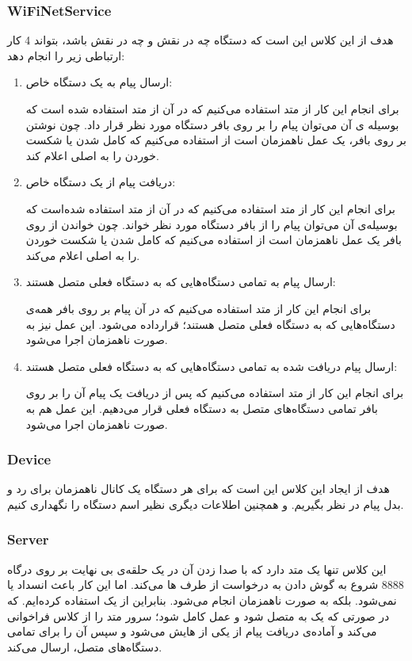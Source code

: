 \subsubsection{WiFiNetService}
هدف از این کلاس این است که دستگاه چه در نقش 
و چه در نقش 
باشد، بتواند 4 کار ارتباطی زیر را انجام دهد:
\begin{enumerate}
	\item ارسال پیام به یک دستگاه خاص:
	
	برای انجام این کار از متد
	استفاده می‌کنیم که در آن از متد 
	استفاده شده است که بوسیله ی آن می‌توان پیام را بر روی بافر دستگاه مورد نظر قرار داد. چون نوشتن بر روی بافر، یک عمل ناهمزمان است از
	استفاده می‌کنیم که کامل شدن یا شکست خوردن را به 
	اصلی اعلام کند.
	\item دریافت پیام از یک دستگاه خاص:
	
	برای انجام این کار از متد
	استفاده می‌کنیم که در آن از متد
	استفاده شده‌است که بوسیله‌ی آن می‌توان پیام را از بافر دستگاه مورد نظر خواند. چون خواندن از روی بافر یک عمل ناهمزمان است از 
	استفاده می‌کنیم که کامل شدن یا شکست خوردن را به 
	اصلی اعلام می‌کند.
	
	\item ارسال پیام به تمامی دستگاه‌هایی که به دستگاه فعلی متصل هستند:

برای انجام این کار از متد
استفاده می‌کنیم که در آن پیام بر روی بافر همه‌ی دستگاه‌هایی که به دستگاه فعلی متصل هستند؛ قرار‌داده می‌شود. این عمل نیز به صورت ناهمزمان اجرا می‌شود.

	\item ارسال پیام دریافت شده به تمامی دستگاه‌هایی که به دستگاه فعلی متصل هستند:
	
	برای انجام این کار از متد
	استفاده می‌کنیم که پس از دریافت یک پیام آن را بر روی بافر تمامی دستگاه‌های متصل به دستگاه فعلی قرار می‌دهیم. این عمل هم به صورت ناهمزمان اجرا می‌شود.
	
\end{enumerate}
\subsubsection{Device}
هدف از ایجاد این کلاس این است که برای هر دستگاه یک کانال ناهمزمان 
برای رد و بدل پیام در نظر بگیریم. و همچنین اطلاعات دیگری نظیر اسم دستگاه را نگهداری کنیم.
\subsubsection{Server}
این کلاس تنها یک متد
 دارد که با صدا زدن آن 
 در یک حلقه‌ی بی نهایت بر روی درگاه 8888 شروع به گوش دادن به درخواست  از طرف 
 ها می‌کند. اما این کار باعث انسداد یا 
نمی‌شود. بلکه به صورت ناهمزمان انجام می‌شود. بنابراین از یک 
استفاده کرده‌ایم. که در صورتی که یک 
به 
متصل شود و عمل کامل شود؛ سرور متد 
را از کلاس 
فراخوانی می‌کند و آماده‌ی دریافت پیام از یکی از 
هایش می‌شود و سپس آن را برای تمامی دستگاه‌های متصل، ارسال می‌کند.

